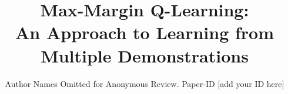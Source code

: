 \documentclass[conference]{IEEEtran}
\begin{document}
\title{Max-Margin Q-Learning:\\ {\huge An Approach to Learning from Multiple Demonstrations}}


\author{Author Names Omitted for Anonymous Review. Paper-ID [add your ID here]}





% 
\end{document}
